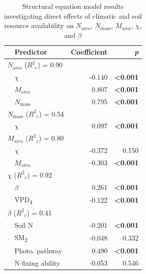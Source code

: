 \newpage
\begin{table}
    \centering
    \caption{Structural equation model results investigating direct effects of climatic and soil resource availability on $N_\mathrm{area}$, $N_\mathrm{mass}$, $M_\mathrm{area}$, $\chi$, and $\beta$}
        \begin{tabular}{p{0.5cm}p{3cm}p{1.5cm}p{1.5cm}}
            \hline
            & Predictor & \multicolumn{1}{r}{Coefficient} & \multicolumn{1}{r}{\textit{p}} \\
            \hline

            \multicolumn{2}{l}{$N_\mathrm{area}$ ($R^2{}_c$) = 0.90} && \\
            & \multicolumn{1}{l}{$\chi$} & \multicolumn{1}{r}{-0.140} & \multicolumn{1}{r}{\textbf{<0.001}} \\
            & \multicolumn{1}{l}{$M_\mathrm{area}$} & \multicolumn{1}{r}{0.807} & \multicolumn{1}{r}{\textbf{<0.001}} \\
            & \multicolumn{1}{l}{$N_\mathrm{mass}$} & \multicolumn{1}{r}{0.795} & \multicolumn{1}{r}{\textbf{<0.001}} \\
            \hline

            \multicolumn{2}{l}{$N_\mathrm{mass}$ ($R^2{}_c$) = 0.54} && \\
            & \multicolumn{1}{l}{$\chi$} & \multicolumn{1}{r}{0.097} & \multicolumn{1}{r}{\textbf{<0.001}} \\
            \hline

            \multicolumn{2}{l}{$M_\mathrm{area}$ ($R^2{}_c$) = 0.80} && \\
            & \multicolumn{1}{l}{$\chi$} & \multicolumn{1}{r}{-0.372} & \multicolumn{1}{r}{0.150} \\
            & \multicolumn{1}{l}{$M_\mathrm{area}$} & \multicolumn{1}{r}{-0.303} & \multicolumn{1}{r}{\textbf{<0.001}} \\
            \hline

            \multicolumn{2}{l}{$\chi$ ($R^2{}_c$) = 0.92} && \\
            & \multicolumn{1}{l}{$\beta$} & \multicolumn{1}{r}{0.261} & \multicolumn{1}{r}{\textbf{<0.001}} \\
            & \multicolumn{1}{l}{VPD\textsubscript{4}} & \multicolumn{1}{r}{-0.122} & \multicolumn{1}{r}{\textbf{<0.001}} \\
            \hline

            \multicolumn{2}{l}{$\beta$ ($R^2{}_c$) = 0.41} && \\
            & \multicolumn{1}{l}{Soil N} & \multicolumn{1}{r}{-0.201} & \multicolumn{1}{r}{\textbf{<0.001}} \\
            & \multicolumn{1}{l}{SM\textsubscript{2}} & \multicolumn{1}{r}{-0.048} & \multicolumn{1}{r}{0.332} \\
            & \multicolumn{1}{l}{Photo. pathway} & \multicolumn{1}{r}{0.490} & \multicolumn{1}{r}{\textbf{<0.001}} \\
            & \multicolumn{1}{l}{N-fixing ability} & \multicolumn{1}{r}{-0.053} & \multicolumn{1}{r}{0.546} \\
            \hline


\end{tabular}
\end{table}
